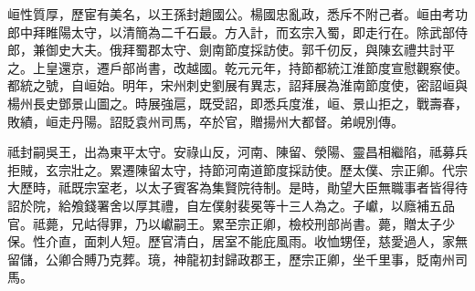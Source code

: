 \begin{pinyinscope}
 峘性質厚，歷宦有美名，以王孫封趙國公。楊國忠亂政，悉斥不附己者。峘由考功郎中拜睢陽太守，以清簡為二千石最。方入計，而玄宗入蜀，即走行在。除武部侍郎，兼御史大夫。俄拜蜀郡太守、劍南節度採訪使。郭千仞反，與陳玄禮共討平之。上皇還京，遷戶部尚書，改越國。乾元元年，持節都統江淮節度宣慰觀察使。都統之號，自峘始。明年，宋州刺史劉展有異志，詔拜展為淮南節度使，密詔峘與楊州長史鄧景山圖之。時展強扈，既受詔，即悉兵度淮，峘、景山拒之，戰壽春，敗績，峘走丹陽。詔貶袁州司馬，卒於官，贈揚州大都督。弟峴別傳。



 祗封嗣吳王，出為東平太守。安祿山反，河南、陳留、滎陽、靈昌相繼陷，祗募兵拒賊，玄宗壯之。累遷陳留太守，持節河南道節度採訪使。歷太僕、宗正卿。代宗大歷時，祗既宗室老，以太子賓客為集賢院待制。是時，勛望大臣無職事者皆得待詔於院，給飧錢署舍以厚其禮，自左僕射裴冕等十三人為之。子巘，以廕補五品官。祗薨，兄岵得罪，乃以巘嗣王。累至宗正卿，檢校刑部尚書。薨，贈太子少保。性介直，面刺人短。歷官清白，居室不能庇風雨。收恤甥侄，慈愛過人，家無留儲，公卿合賻乃克葬。璄，神龍初封歸政郡王，歷宗正卿，坐千里事，貶南州司馬。




\end{pinyinscope}
